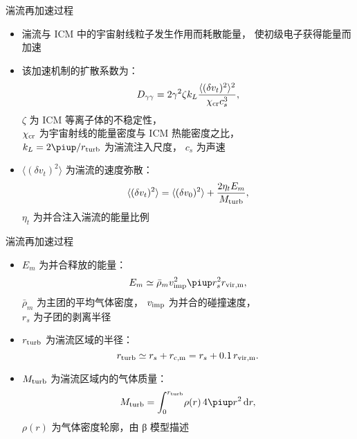 \documentclass{beamer}
\begin{document}
\begin{frame}[t]
  \begin{alertblock}{湍流再加速过程}
    \smallskip
    \begin{itemize}
      \item 湍流与 ICM 中的宇宙射线粒子发生作用而耗散能量，
        使初级电子获得能量而加速
      \item 该加速机制的扩散系数为：
        \begin{equation}
          D_{\gamma\gamma} =
            2 \gamma^2 \zeta k_L
            \frac{\langle (\delta v_t)^2 \rangle^2}{\chi_{\text{cr}} c_s^3} ,
        \end{equation}
        $\zeta$ 为 ICM 等离子体的不稳定性，\\
        $\chi_{\text{cr}}$ 为宇宙射线的能量密度与 ICM 热能密度之比，\\
        $k_L = 2\Cpi / r_{\R{turb}}$ 为湍流注入尺度，
        $c_s$ 为声速
      \item $\langle (\delta v_t)^2 \rangle$ 为湍流的速度弥散：
        \begin{equation}
          \langle (\delta v_t)^2 \rangle =
            \langle (\delta v_0)^2 \rangle +
            \frac{2 \eta_t E_m}{M_{\text{turb}}} ,
        \end{equation}
        $\eta_t$ 为并合注入湍流的能量比例
    \end{itemize}
  \end{alertblock}
\end{frame}

\begin{frame}[t]
  \begin{alertblock}{湍流再加速过程}
    \smallskip
    \begin{itemize}
      \item $E_m$ 为并合释放的能量：
        \begin{equation}
          E_m \simeq \bar{\rho}_m v_{\R{imp}}^2
            \Cpi r_s^2 r_{\R{vir,m}} ,
        \end{equation}
        $\bar{\rho}_m$ 为主团的平均气体密度，
        $v_{\text{imp}}$ 为并合的碰撞速度，\\
        $r_s$ 为子团的剥离半径
      \item $r_{\text{turb}}$ 为湍流区域的半径：
        \begin{equation}
          r_{\text{turb}} \simeq r_s + r_{\text{c,m}}
            = r_s + 0.1\,r_{\text{vir,m}} .
        \end{equation}
      \item $M_{\text{turb}}$ 为湍流区域内的气体质量：
        \begin{equation}
          M_{\R{turb}} =
            \int_0^{r_{\R{turb}}} \! \rho(r) \,4\Cpi r^2 \,\D{r} ,
        \end{equation}
        $\rho(r)$ 为气体密度轮廓，由 β 模型描述
    \end{itemize}
  \end{alertblock}
\end{frame}
\end{document}
